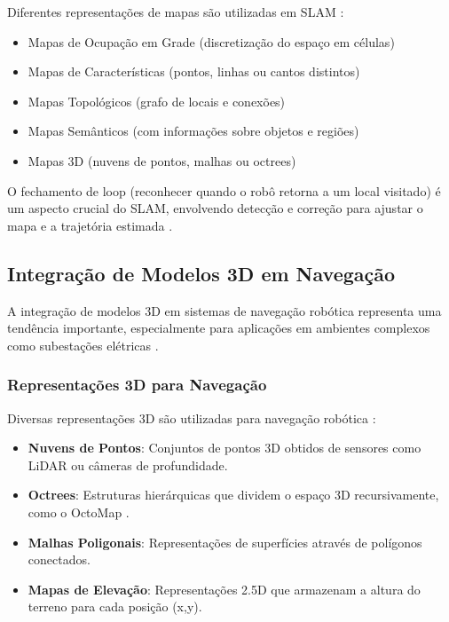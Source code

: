 Diferentes representações de mapas são utilizadas em SLAM \cite{Thrun2005, Cadena2016}:

\begin{itemize}
    \item Mapas de Ocupação em Grade (discretização do espaço em células) \cite{Elfes1989}
    \item Mapas de Características (pontos, linhas ou cantos distintos) \cite{Smith1990}
    \item Mapas Topológicos (grafo de locais e conexões) \cite{Kuipers1991}
    \item Mapas Semânticos (com informações sobre objetos e regiões) \cite{Kostavelis2015}
    \item Mapas 3D (nuvens de pontos, malhas ou octrees) \cite{Hornung2013}
\end{itemize}

O fechamento de loop (reconhecer quando o robô retorna a um local visitado) é um aspecto crucial do SLAM, envolvendo detecção e correção para ajustar o mapa e a trajetória estimada \cite{Durrant2006, Cadena2016}.

\subsection{Integração de Modelos 3D em Navegação}

A integração de modelos 3D em sistemas de navegação robótica representa uma tendência importante, especialmente para aplicações em ambientes complexos como subestações elétricas \cite{Hornung2013, Rusu2011}.

\subsubsection{Representações 3D para Navegação}

Diversas representações 3D são utilizadas para navegação robótica \cite{Hornung2013, Rusu2011}:

\begin{itemize}
    \item \textbf{Nuvens de Pontos}: Conjuntos de pontos 3D obtidos de sensores como LiDAR ou câmeras de profundidade.
    
    \item \textbf{Octrees}: Estruturas hierárquicas que dividem o espaço 3D recursivamente, como o OctoMap \cite{Hornung2013}.
    
    \item \textbf{Malhas Poligonais}: Representações de superfícies através de polígonos conectados.
    
    \item \textbf{Mapas de Elevação}: Representações 2.5D que armazenam a altura do terreno para cada posição (x,y).
\end{itemize}

